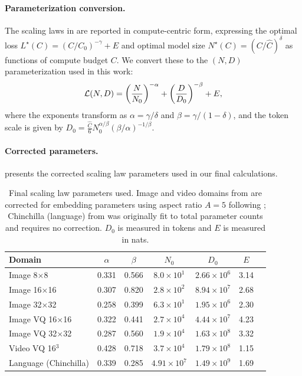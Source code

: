 \documentclass[twoside]{article}
\renewcommand{\L}{\mathcal{L}}
\renewcommand{\L}{\mathcal{L}}
\begin{document}
\paragraph{Parameterization conversion.}
The scaling laws in \citet{henighan2020scaling} are reported in compute-centric form, expressing the optimal loss $L^\star(C) = (C/C_0)^{-\gamma} + E$ and optimal model size $N^\star(C) = (C/\hat{C})^{\delta}$ as functions of compute budget $C$. We convert these to the $(N, D)$ parameterization used in this work:
\begin{align}
    \L(N, D) = \qty(\frac{N}{N_0})^{-\alpha} + \qty(\frac{D}{D_0})^{-\beta} + E,
\end{align}
where the exponents transform as $\alpha = \gamma / \delta$ and $\beta = \gamma / (1 - \delta)$, and the token scale is given by $D_0 = \frac{\hat{C}}{6} N_0^{\alpha/\beta} (\beta/\alpha)^{-1/\beta}$.

\paragraph{Corrected parameters.}
 presents the corrected scaling law parameters used in our final calculations.

\begin{table}[H]
\centering
\caption{Final scaling law parameters used. Image and video domains from \citet{henighan2020scaling} are corrected for embedding parameters using aspect ratio $A = 5$ following \citep{pearce2024reconciling}; Chinchilla (language) from \citet{hoffmann2022training} was originally fit to total parameter counts and requires no correction. $D_0$ is measured in tokens and $E$ is measured in nats.}
\label{tab:scaling-params}
\begin{tabular}{lcccccc}
\toprule
Domain & $\alpha$ & $\beta$ & $N_0$ & $D_0$ & $E$ \\
\midrule
Image 8$\times$8 & 0.331 & 0.566 & $8.0 \times 10^{1}$ & $2.66 \times 10^{6}$ & 3.14 \\
Image 16$\times$16 & 0.307 & 0.820 & $2.8 \times 10^{2}$ & $8.94 \times 10^{7}$ & 2.68 \\
Image 32$\times$32 & 0.258 & 0.399 & $6.3 \times 10^{1}$ & $1.95 \times 10^{6}$ & 2.30 \\
Image VQ 16$\times$16 & 0.322 & 0.441 & $2.7 \times 10^{4}$ & $4.44 \times 10^{7}$ & 4.23 \\
Image VQ 32$\times$32 & 0.287 & 0.560 & $1.9 \times 10^{4}$ & $1.63 \times 10^{8}$ & 3.32 \\
Video VQ 16$^3$ & 0.428 & 0.718 & $3.7 \times 10^{4}$ & $1.79 \times 10^{8}$ & 1.15 \\
Language (Chinchilla) & 0.339 & 0.285 & $4.91 \times 10^{7}$ & $1.49 \times 10^{9}$ & 1.69 \\
\bottomrule
\end{tabular}
\end{table}
\end{document}
